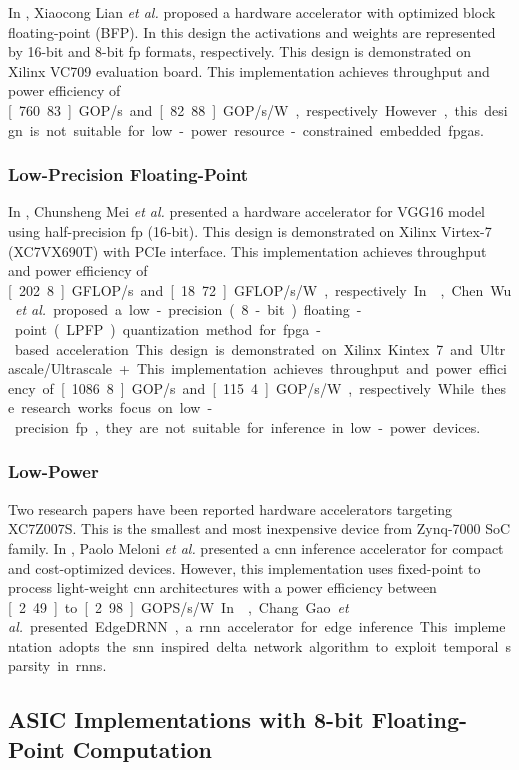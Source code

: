 In \cite{lian2019high}, Xiaocong Lian \textit{et al.} proposed a hardware accelerator with optimized block floating-point (BFP). In this design the activations and weights are represented by 16-bit and 8-bit \gls{fp} formats, respectively. This design is demonstrated on Xilinx VC709 evaluation board. This implementation achieves throughput and power efficiency of \unit[760.83]{GOP/s} and \unit[82.88]{GOP/s/W}, respectively. However, this design is not suitable for low-power resource-constrained embedded \glspl{fpga}.

\subsubsection{Low-Precision Floating-Point}
In \cite{mei2017200mhz}, Chunsheng Mei \textit{et al.} presented a hardware accelerator for VGG16 model using half-precision \gls{fp} (16-bit). This design is demonstrated on Xilinx Virtex-7 (XC7VX690T) with PCIe interface. This implementation achieves throughput and power efficiency of \unit[202.8]{GFLOP/s} and \unit[18.72]{GFLOP/s/W}, respectively. In \cite{wu2021low}, Chen Wu \textit{et al.} proposed a low-precision (8-bit) floating-point (LPFP) quantization method for \gls{fpga}-based acceleration. This design is demonstrated on Xilinx Kintex 7 and Ultrascale/Ultrascale+. This implementation achieves throughput and power efficiency of \unit[1086.8]{GOP/s} and \unit[115.4]{GOP/s/W}, respectively. While these research works focus on low-precision \gls{fp}, they are not suitable for inference in low-power devices.

\subsubsection{Low-Power}
Two research papers have been reported hardware accelerators targeting XC7Z007S. This is the smallest and most inexpensive device from Zynq-7000 SoC family. In \cite{meloni2019cnn}, Paolo Meloni \textit{et al.} presented a \gls{cnn} inference accelerator for compact and cost-optimized devices. However, this implementation uses fixed-point to process light-weight \gls{cnn} architectures with a power efficiency between \unit[2.49] to \unit[2.98]{GOPS/s/W}.

In \cite{gao2020edgedrnn}, Chang Gao \textit{et al.} presented EdgeDRNN, a \gls{rnn} accelerator for edge inference. This implementation adopts the \gls{snn} inspired delta network algorithm to exploit temporal sparsity in \glspl{rnn}.
\subsection{ASIC Implementations with 8-bit Floating-Point Computation}

